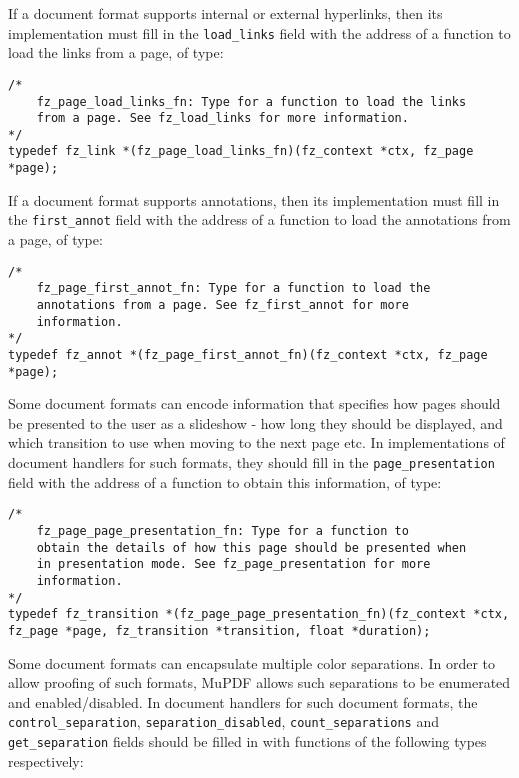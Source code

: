 \documentclass[oneside]{book}
\begin{document}
If a document format supports internal or external hyperlinks, then its implementation must fill in the \texttt{load\_links} field with the address of a function to load the links from a page, of type:

\begin{lstlisting}
/*
	fz_page_load_links_fn: Type for a function to load the links
	from a page. See fz_load_links for more information.
*/
typedef fz_link *(fz_page_load_links_fn)(fz_context *ctx, fz_page *page);
\end{lstlisting}

If a document format supports annotations, then its implementation must fill in the \texttt{first\_annot} field with the address of a function to load the annotations from a page, of type:

\begin{lstlisting}
/*
	fz_page_first_annot_fn: Type for a function to load the
	annotations from a page. See fz_first_annot for more
	information.
*/
typedef fz_annot *(fz_page_first_annot_fn)(fz_context *ctx, fz_page *page);
\end{lstlisting}

Some document formats can encode information that specifies how pages should be presented to the user as a slideshow - how long they should be displayed, and which transition to use when moving to the next page etc. In implementations of document handlers for such formats, they should fill in the \texttt{page\_presentation} field with the address of a function to obtain this information, of type:

\begin{lstlisting}
/*
	fz_page_page_presentation_fn: Type for a function to
	obtain the details of how this page should be presented when
	in presentation mode. See fz_page_presentation for more
	information.
*/
typedef fz_transition *(fz_page_page_presentation_fn)(fz_context *ctx, fz_page *page, fz_transition *transition, float *duration);
\end{lstlisting}

Some document formats can encapsulate multiple color separations. In order to allow proofing of such formats, MuPDF allows such separations to be enumerated and enabled/disabled. In document handlers for such document formats, the \texttt{control\_separation}, \texttt{separation\_disabled}, \texttt{count\_separations} and \texttt{get\_separation} fields should be filled in with functions of the following types respectively:
\end{document}
